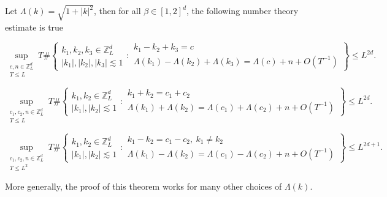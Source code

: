 \begin{thm}\label{th.numbertheory1.fourwave}
Let $\Lambda(k)=\sqrt{1+|k|^2}$, then for all $\beta\in [1,2]^d$, the following number theory estimate is true

\begin{equation}\label{eq.numbertheory1.fourwave}
    \sup_{\substack{c,n\in\mathbb{Z}_L^d\\T\le L}}
    T\#\left\{
        \begin{matrix}
            k_1,k_2,k_3\in\mathbb{Z}_L^d \\
            |k_1|,|k_2|,|k_3|\lesssim 1
        \end{matrix}
        :
        \begin{matrix}
            k_1-k_2+k_3=c \\
            \Lambda(k_1)-\Lambda(k_2)+\Lambda(k_3)=\Lambda(c)+n+O(T^{-1})
        \end{matrix}
    \right\}\le L^{2d}.
\end{equation}

\begin{equation}\label{eq.numbertheory1'.fourwave}
    \sup_{\substack{c_1,c_2,n\in\mathbb{Z}_L^d\\T\le L}}
    T\#\left\{
        \begin{matrix}
            k_1,k_2\in\mathbb{Z}_L^d \\
            |k_1|, |k_2|\lesssim 1
        \end{matrix}
        :
        \begin{matrix}
            k_1+ k_2=c_1+ c_{2} \\
            \Lambda(k_1)+\Lambda(k_2)=\Lambda(c_1)+ \Lambda(c_2)+n+O(T^{-1})
        \end{matrix}
        \right\}\le L^{2d}.
\end{equation}

\begin{equation}\label{eq.numbertheory1''.fourwave}
    \sup_{\substack{c_1,c_2,n\in\mathbb{Z}_L^d\\T\le L^2}}
    T\#\left\{
        \begin{matrix}
            k_1,k_2\in\mathbb{Z}_L^d \\
            |k_1|, |k_2|\lesssim 1
        \end{matrix}
        :
        \begin{matrix}
            k_1- k_2=c_1- c_{2},\ k_1\ne k_2 \\
            \Lambda(k_1)-\Lambda(k_2)=\Lambda(c_1)- \Lambda(c_2)+n+O(T^{-1})
        \end{matrix}
        \right\}\le L^{2d+1}.
\end{equation}

More generally, the proof of this theorem works for many other choices of $\Lambda(k)$.
\end{thm}



